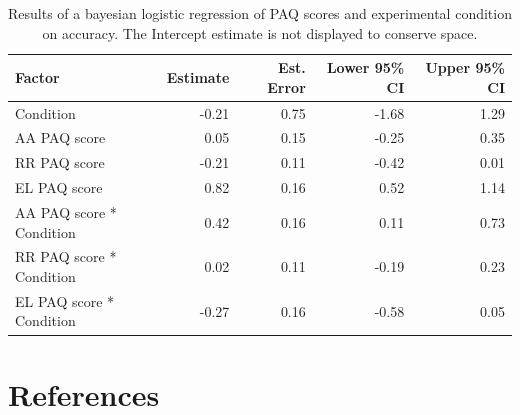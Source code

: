 \documentclass[man]{apa6}
\theoremstyle{definition}
\theoremstyle{definition}
\theoremstyle{definition}
\theoremstyle{remark}
\begin{document}
\begin{table}[h]
\centering
\begin{tabular}{lrrrr}
  \hline
Factor & Estimate & Est. Error & Lower 95\% CI & Upper 95\% CI \\ 
  \hline
Condition & -0.21 & 0.75 & -1.68 & 1.29 \\ 
  AA PAQ score & 0.05 & 0.15 & -0.25 & 0.35 \\ 
  RR PAQ score & -0.21 & 0.11 & -0.42 & 0.01 \\ 
  EL PAQ score & 0.82 & 0.16 & 0.52 & 1.14 \\ 
  AA PAQ score * Condition & 0.42 & 0.16 & 0.11 & 0.73 \\ 
  RR PAQ score * Condition & 0.02 & 0.11 & -0.19 & 0.23 \\ 
  EL PAQ score * Condition & -0.27 & 0.16 & -0.58 & 0.05 \\ 
   \hline
\end{tabular}
\caption{Results of a bayesian logistic regression of PAQ scores and experimental condition on accuracy. The Intercept estimate is not displayed to conserve space.} 
\end{table}

\newpage

\section{References}\label{references}

\begingroup
\setlength{\parindent}{-0.5in} \setlength{\leftskip}{0.5in}

\hypertarget{refs}{}

\endgroup
\end{document}
